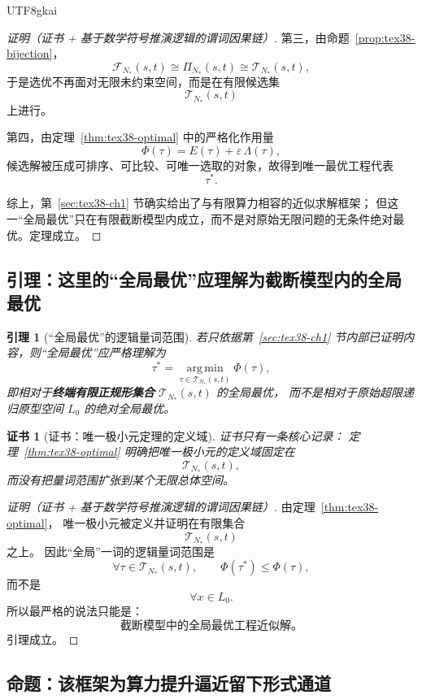 \documentclass[12pt]{article}
\newtheorem{lemma}{引理}[section]
\newtheorem{Certificate}{证书}[section]
\begin{document}
\begin{CJK*}{UTF8}{gkai}
\begin{proof}[证明（证书 + 基于数学符号推演逻辑的谓词因果链）]
第三，由命题~\ref{prop:tex38-bijection}，
\[
  \mathcal{F}_{N_\ast}(s,t)
  \cong
  \Pi_{N_\ast}(s,t)
  \cong
  \mathcal{T}_{N_\ast}(s,t),
\]
于是选优不再面对无限未约束空间，而是在有限候选集
\[
  \mathcal{T}_{N_\ast}(s,t)
\]
上进行。

第四，由定理~\ref{thm:tex38-optimal} 中的严格化作用量
\[
  \Phi(\tau)=E(\tau)+\varepsilon\,\Lambda(\tau),
\]
候选解被压成可排序、可比较、可唯一选取的对象，故得到唯一最优工程代表
\[
  \tau^\ast.
\]

综上，第~\ref{sec:tex38-ch1} 节确实给出了与有限算力相容的近似求解框架；
但这一“全局最优”只在有限截断模型内成立，而不是对原始无限问题的无条件绝对最优。定理成立。
\end{proof}

\subsection{引理：这里的“全局最优”应理解为截断模型内的全局最优}
\label{subsec:tex38-bridge-lemma}

\begin{lemma}[“全局最优”的逻辑量词范围]
\label{lem:tex38-bridge-global}
若只依据第~\ref{sec:tex38-ch1} 节内部已证明内容，则“全局最优”应严格理解为
\[
  \tau^\ast
  =
  \operatorname*{arg\,min}_{\tau\in\mathcal{T}_{N_\ast}(s,t)}\Phi(\tau),
\]
即相对于\textbf{终端有限正规形集合} $\mathcal{T}_{N_\ast}(s,t)$ 的全局最优，
而不是相对于原始超限递归原型空间 $L_0$ 的绝对全局最优。
\end{lemma}

\begin{Certificate}[证书：唯一极小元定理的定义域]
\label{cert:tex38-bridge-global}
证书只有一条核心记录：
定理~\ref{thm:tex38-optimal} 明确把唯一极小元的定义域固定在
\[
  \mathcal{T}_{N_\ast}(s,t),
\]
而没有把量词范围扩张到某个无限总体空间。
\end{Certificate}

\begin{proof}[证明（证书 + 基于数学符号推演逻辑的谓词因果链）]
由定理~\ref{thm:tex38-optimal}，
唯一极小元被定义并证明在有限集合
\[
  \mathcal{T}_{N_\ast}(s,t)
\]
之上。
因此“全局”一词的逻辑量词范围是
\[
  \forall \tau\in\mathcal{T}_{N_\ast}(s,t),
  \qquad
  \Phi(\tau^\ast)\le \Phi(\tau),
\]
而不是
\[
  \forall x\in L_0.
\]
所以最严格的说法只能是：
\[
  \text{截断模型中的全局最优工程近似解。}
\]
引理成立。
\end{proof}

\subsection{命题：该框架为算力提升逼近留下形式通道}
\label{subsec:tex38-bridge-prop-approx}


\end{CJK*}
\end{document}
